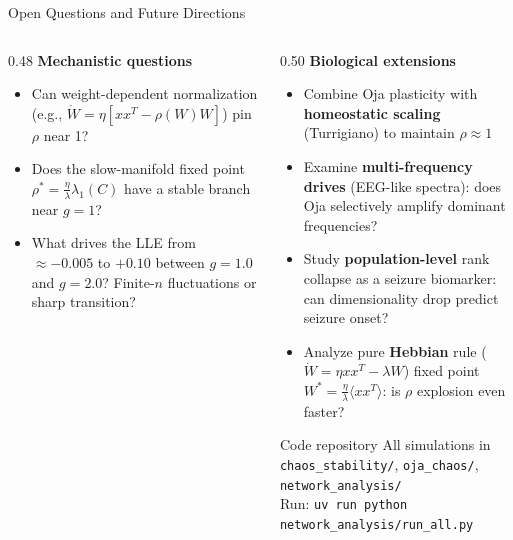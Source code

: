 \documentclass[11pt,aspectratio=169]{beamer}
\begin{document}
\begin{frame}{Open Questions and Future Directions}

\begin{columns}[T]
\begin{column}{0.48\textwidth}
\textbf{Mechanistic questions}
\begin{itemize}
  \item Can weight-dependent normalization (e.g., $\dot{W} = \eta[xx^T - \rho(W)W]$)
        pin $\rho$ near 1?
  \item Does the slow-manifold fixed point $\rho^* = \tfrac{\eta}{\lambda}\lambda_1(C)$
        have a stable branch near $g=1$?
  \item What drives the LLE from $\approx -0.005$ to $+0.10$ between $g=1.0$ and $g=2.0$?
        Finite-$n$ fluctuations or sharp transition?
\end{itemize}
\end{column}
\begin{column}{0.50\textwidth}
\textbf{Biological extensions}
\begin{itemize}
  \item Combine Oja plasticity with \textbf{homeostatic scaling} (Turrigiano) to
        maintain $\rho \approx 1$
  \item Examine \textbf{multi-frequency drives} (EEG-like spectra): does Oja
        selectively amplify dominant frequencies?
  \item Study \textbf{population-level} rank collapse as a seizure biomarker:
        can dimensionality drop predict seizure onset?
  \item Analyze pure \textbf{Hebbian} rule ($\dot{W} = \eta xx^T - \lambda W$)
        fixed point $W^* = \tfrac{\eta}{\lambda}\langle xx^T\rangle$:
        is $\rho$ explosion even faster?
\end{itemize}

\vspace{0.3em}
\begin{block}{Code repository}
All simulations in \texttt{chaos\_stability/}, \texttt{oja\_chaos/}, \texttt{network\_analysis/}\\
Run: \texttt{uv run python network\_analysis/run\_all.py}
\end{block}
\end{column}
\end{columns}
\end{frame}
\end{document}
